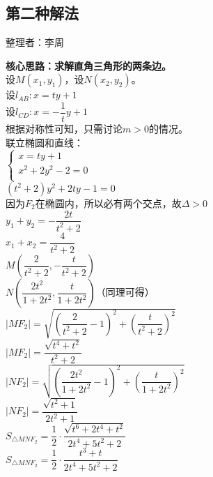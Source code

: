 \documentclass[UTF8]{ctexart}
\begin{document}
\newpage

\subsection{第二种解法}
    \begin{center}
        整理者：李周
    \end{center}
    \begin{multicols}{2}
        \small
        \textbf{核心思路：求解直角三角形的两条边。}\\[5mm]
        设$M(x_{1},y_{1})$，设$N(x_{2},y_{2})$。\\[5mm]  
        设$l_{AB}:x=ty+1$\\[5mm]
        设$l_{CD}:x=-\dfrac{1}{t}y+1$\\[5mm]
        根据对称性可知，只需讨论$m>0$的情况。\\[5mm]
        联立椭圆和直线：\\[5mm]
        \begin{math}
            \begin{cases}
                x=ty+1\\[1mm]  
                x^2+2y^2-2=0\\[1mm]
            \end{cases}    
        \end{math}\\[5mm]
        $(t^2+2)y^2+2ty-1=0$\\[5mm]
        因为$F_{2}$在椭圆内，所以必有两个交点，故$\Delta >0$\\[5mm]
        $y_{1}+y_{2}=-\dfrac{2t}{t^2+2}$\\[5mm]
        $x_{1}+x_{2}=\dfrac{4}{t^2+2}$\\[5mm]
        $M(\dfrac{2}{t^2+2},-\dfrac{t}{t^2+2})$\\[5mm]
        $N(\dfrac{2t^2}{1+2t^2},\dfrac{t}{1+2t^2})$（同理可得）\\[8mm]
        $\left|MF_{2}\right|=\sqrt{(\dfrac{2}{t^2+2}-1)^2+(\dfrac{t}{t^2+2})^2}$\\[5mm]
        $\left|MF_{2}\right|=\dfrac{\sqrt{t^4+t^2} }{t^2+2}$\\[5mm]
        $\left|NF_{2}\right|=\sqrt{(\dfrac{2t^2}{1+2t^2}-1)^2+(\dfrac{t}{1+2t^2})^2}$\\[5mm]
        $\left|NF_{2}\right|=\dfrac{\sqrt{t^2+1} }{2t^2+1}$\\[50mm]
        $S_{\triangle MNF_{2}}=\dfrac{1}{2}\cdot\dfrac{\sqrt{t^6+2t^4+t^2}}{2t^4+5t^2+2}$\\[5mm]
        $S_{\triangle MNF_{2}}=\dfrac{1}{2}\cdot\dfrac{t^3+t}{2t^4+5t^2+2}$\\[5mm]

\end{multicols}
\end{document}
